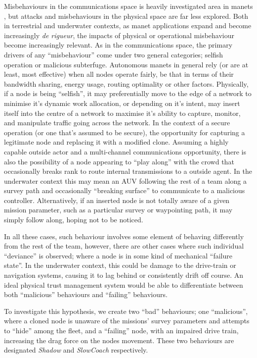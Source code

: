 Misbehaviours in the communications space is heavily investigated area in \glspl{manet} \cite{Konate2011,Wang2009,Chen2014a,Mitchell2014}, but attacks and misbehaviours in the physical space are far less explored. 
Both in terrestrial and underwater contexts, as \gls{manet} applications expand and become increasingly \emph{de rigueur}, the impacts of physical or operational misbehaviour become increasingly relevant. 
As in the communications space, the primary drivers of any ``misbehaviour'' come under two general categories; selfish operation or malicious subterfuge.
Autonomous \glspl{manet} in general rely (or are at least, most effective) when all nodes operate fairly, be that in terms of their bandwidth sharing, energy usage, routing optimality or other factors. 
Physically, if a node is being ``selfish'', it may preferentially move to the edge of a network to minimise it's dynamic work allocation, or depending on it's intent, may insert itself into the centre of a network to maximise it's ability to capture, monitor, and manipulate traffic going across the network. 
In the context of a secure operation (or one that's assumed to be secure), the opportunity for capturing a legitimate node and replacing it with a modified clone.
Assuming a highly capable outside actor and a multi-channel communications opportunity, there is also the possibility of a node appearing to ``play along'' with the crowd that occasionally breaks rank to route internal transmissions to a outside agent.
In the underwater context this may mean an AUV following the rest of a team along a survey path and occasionally ``breaking surface'' to communicate to a malicious controller.
Alternatively, if an inserted node is not totally aware of a given mission parameter, such as a particular survey or waypointing path, it may simply follow along, hoping not to be noticed.

In all these cases, such behaviour involves some element of behaving differently from the rest of the team, however, there are other cases where such individual ``deviance'' is observed; where a node is in some kind of mechanical ``failure state''.
In the underwater context, this could be damage to the drive-train or navigation systems, causing it to lag behind or consistently drift off course. 
An ideal physical trust management system would be able to differentiate between both ``malicious'' behaviours and ``failing'' behaviours.

To investigate this hypothesis, we create two ``bad'' behaviours; one ``malicious'', where a cloned node is unaware of the missions' survey parameters and attempts to ``hide'' among the fleet, and a ``failing'' node, with an impaired drive train, increasing the drag force on the nodes movement.
These two behaviours are designated \emph{Shadow} and \emph{SlowCoach} respectively.

